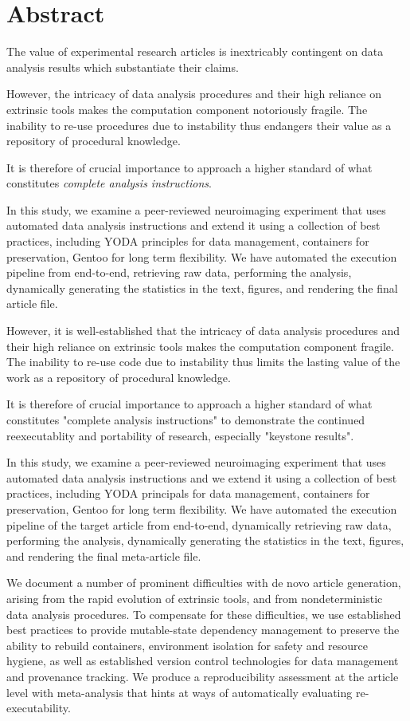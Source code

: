 \section{Abstract}

The value of experimental research articles is inextricably contingent on data analysis results which substantiate their claims.

However, the intricacy of data analysis procedures and their high reliance on extrinsic tools makes the computation component notoriously fragile.
The inability to re-use procedures due to instability thus endangers their value as a repository of procedural knowledge.

It is therefore of crucial importance to approach a higher standard of what constitutes \textit{complete analysis instructions}.

In this study, we examine a peer-reviewed neuroimaging experiment that uses automated data analysis instructions and extend it using a collection of best practices, including YODA principles for data management, containers for preservation, Gentoo for long term flexibility.
We have automated the execution pipeline from end-to-end, retrieving raw data, performing the analysis, dynamically generating the statistics in the text, figures, and rendering the final article file.


However, it is well-established that the intricacy of data analysis procedures and their high reliance on extrinsic tools makes the computation component fragile.
The inability to re-use code due to instability thus limits the lasting value of the work as a repository of procedural knowledge.

It is therefore of crucial importance to approach a higher standard of what constitutes "complete analysis instructions" to demonstrate the continued reexecutablity and portability of research, especially "keystone results".

In this study, we examine a peer-reviewed neuroimaging experiment that uses automated data analysis instructions and we extend it using a collection of best practices, including YODA principals for data management, containers for preservation, Gentoo for long term flexibility.
We have automated the execution pipeline of the target article from end-to-end, dynamically retrieving raw data, performing the analysis, dynamically generating the statistics in the text, figures, and rendering the final meta-article file. 


We document a number of prominent difficulties with de novo article generation, arising from the rapid evolution of extrinsic tools, and from nondeterministic data analysis procedures.
To compensate for these difficulties, we use established best practices to provide mutable-state dependency management to preserve the ability to rebuild containers, environment isolation for safety and resource hygiene, as well as established version control technologies for data management and provenance tracking.
We produce a reproducibility assessment at the article level with meta-analysis that hints at ways of automatically evaluating re-executability.

